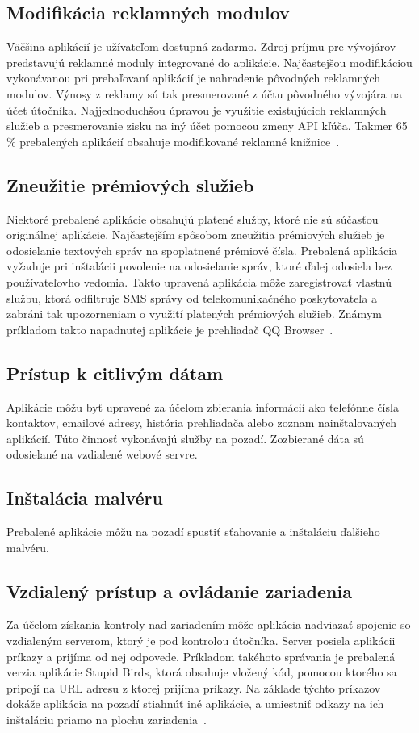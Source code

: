 \subsection*{Modifikácia reklamných modulov}
Väčšina aplikácií je užívateľom dostupná zadarmo. Zdroj príjmu pre vývojárov predstavujú reklamné moduly integrované do aplikácie. Najčastejšou modifikáciou vykonávanou pri prebaľovaní aplikácií je nahradenie pôvodných reklamných modulov. Výnosy z reklamy sú tak presmerované z účtu pôvodného vývojára na účet útočníka. Najjednoduchšou úpravou je využitie existujúcich reklamných služieb a presmerovanie zisku na iný účet pomocou zmeny API kľúča. Takmer 65 \% prebalených aplikácií obsahuje modifikované reklamné knižnice~\cite{fakeapps}.

\subsection*{Zneužitie prémiových služieb}
Niektoré prebalené aplikácie obsahujú platené služby, ktoré nie sú súčasťou originálnej aplikácie. Najčastejším spôsobom zneužitia prémiových služieb je odosielanie textových správ na spoplatnené prémiové čísla. Prebalená aplikácia vyžaduje pri inštalácii povolenie na odosielanie správ, ktoré ďalej odosiela bez používateľovho vedomia. Takto upravená aplikácia môže zaregistrovať vlastnú službu, ktorá odfiltruje SMS správy od telekomunikačného poskytovateľa a zabráni tak upozorneniam o využití platených prémiových služieb. Známym príkladom takto napadnutej aplikácie je prehliadač QQ Browser~\cite{fakeapps}.

\subsection*{Prístup k citlivým dátam}
Aplikácie môžu byť upravené za účelom zbierania informácií ako telefónne čísla kontaktov, emailové adresy, história prehliadača alebo zoznam nainštalovaných aplikácií. Túto činnosť vykonávajú služby na pozadí. Zozbierané dáta sú odosielané na vzdialené webové servre. 

\subsection*{Inštalácia malvéru}
Prebalené aplikácie môžu na pozadí spustiť sťahovanie a inštaláciu ďalšieho malvéru. 

\subsection*{Vzdialený prístup a ovládanie zariadenia}
Za účelom získania kontroly nad zariadením môže aplikácia nadviazať spojenie so vzdialeným serverom, ktorý je pod kontrolou útočníka. Server posiela aplikácii príkazy a prijíma od nej odpovede. Príkladom takéhoto správania je prebalená verzia aplikácie Stupid Birds, ktorá obsahuje vložený kód, pomocou ktorého sa pripojí na URL adresu z ktorej prijíma príkazy. Na základe týchto príkazov dokáže aplikácia na pozadí stiahnúť iné aplikácie, a umiestniť odkazy na ich inštaláciu priamo na plochu zariadenia~\cite{fakeapps}. 


